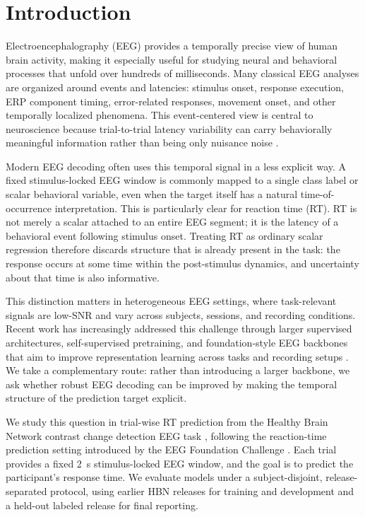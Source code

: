 \documentclass[12pt]{article}
\begin{document}
\section{Introduction}

Electroencephalography (EEG) provides a temporally precise view of human brain activity, making it especially useful for studying neural and behavioral processes that unfold over hundreds of milliseconds. Many classical EEG analyses are organized around events and latencies: stimulus onset, response execution, ERP component timing, error-related responses, movement onset, and other temporally localized phenomena. This event-centered view is central to neuroscience because trial-to-trial latency variability can carry behaviorally meaningful information rather than being only nuisance noise \citep{Jung1998SingleTrialERP,Ouyang2017LatencyReview}.

Modern EEG decoding often uses this temporal signal in a less explicit way. A fixed stimulus-locked EEG window is commonly mapped to a single class label or scalar behavioral variable, even when the target itself has a natural time-of-occurrence interpretation. This is particularly clear for reaction time (RT). RT is not merely a scalar attached to an entire EEG segment; it is the latency of a behavioral event following stimulus onset. Treating RT as ordinary scalar regression therefore discards structure that is already present in the task: the response occurs at some time within the post-stimulus dynamics, and uncertainty about that time is also informative.

This distinction matters in heterogeneous EEG settings, where task-relevant signals are low-SNR and vary across subjects, sessions, and recording conditions. Recent work has increasingly addressed this challenge through larger supervised architectures, self-supervised pretraining, and foundation-style EEG backbones that aim to improve representation learning across tasks and recording setups \citep{wang2024eegpt,Jiang2024LaBraM,Chen2024EEGFormer,Wang2025EEGMamba,ElOuahidi2025REVE,Yue2024BrainGPT}. We take a complementary route: rather than introducing a larger backbone, we ask whether robust EEG decoding can be improved by making the temporal structure of the prediction target explicit.

We study this question in trial-wise RT prediction from the Healthy Brain Network contrast change detection EEG task \citep{Shirazi2024HBNEEG}, following the reaction-time prediction setting introduced by the EEG Foundation Challenge \citep{EEGFoundationChallengeArxiv2025,EEGChallengeWebsite2025}. Each trial provides a fixed 2~s stimulus-locked EEG window, and the goal is to predict the participant's response time. We evaluate models under a subject-disjoint, release-separated protocol, using earlier HBN releases for training and development and a held-out labeled release for final reporting.
\end{document}
